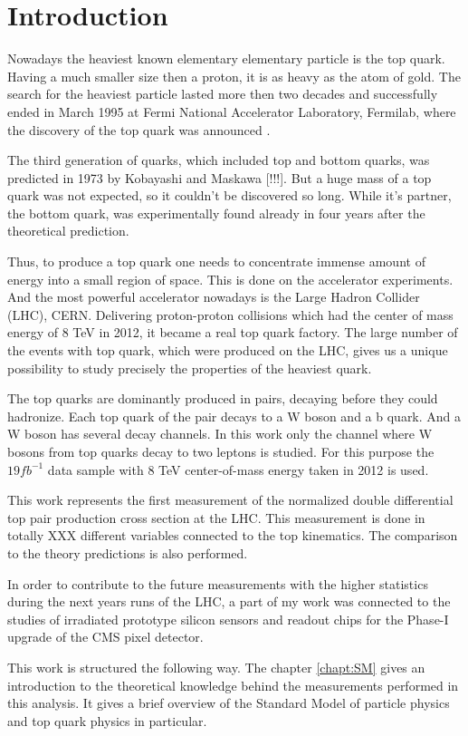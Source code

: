 \chapter{Introduction}

Nowadays the heaviest known elementary elementary particle is the top quark. 
Having a much smaller size then a proton, it is as heavy as the atom of gold. 
The search for the heaviest particle lasted more then two decades and successfully 
ended in March 1995 at Fermi National Accelerator Laboratory, Fermilab, where 
the discovery of the top quark was announced \cite{PhysRevLett.74.2626}. 

The third generation of quarks, which included top and bottom quarks, 
was predicted in 1973 by Kobayashi and Maskawa [!!!]. But a huge mass of a 
top quark was not expected, so it couldn't be discovered so long. While it's partner, 
the bottom quark, was experimentally found already in four years after the theoretical prediction. 

Thus, to produce a top quark one needs to concentrate immense amount of energy 
into a small region of space. This is done on the accelerator experiments. 
And the most powerful accelerator nowadays is the Large Hadron Collider (LHC), CERN. 
Delivering proton-proton collisions which had the center of mass energy of 8 TeV in 2012, 
it became a real top quark factory. The large number of the events with top quark, 
which were produced on the LHC, gives us a unique possibility to study precisely the properties of the heaviest quark. 

The top quarks are dominantly produced in pairs, decaying before they could hadronize. 
Each top quark of the pair decays to a W boson and a b quark. 
And a W boson has several decay channels. In this work only the channel 
where W bosons from top quarks decay to two leptons is studied. 
For this purpose the $19 fb^{-1}$ data sample with 8 TeV center-of-mass energy taken in 2012 is used.

This work represents the first measurement of the normalized double differential top pair production
cross section at the LHC. This measurement is done in totally XXX different variables
connected to the top kinematics. The comparison to the theory predictions is also performed.

In order to contribute to the future measurements with the higher statistics during
the next years runs of the LHC, a part of my work was connected to the studies of irradiated
prototype silicon sensors and readout chips for the Phase-I upgrade of the CMS pixel detector.

This work is structured the following way. The chapter \ref{chapt:SM} gives an introduction to the theoretical
knowledge behind the measurements performed in this analysis. It gives a brief overview of the Standard
Model of particle physics and top quark physics in particular.